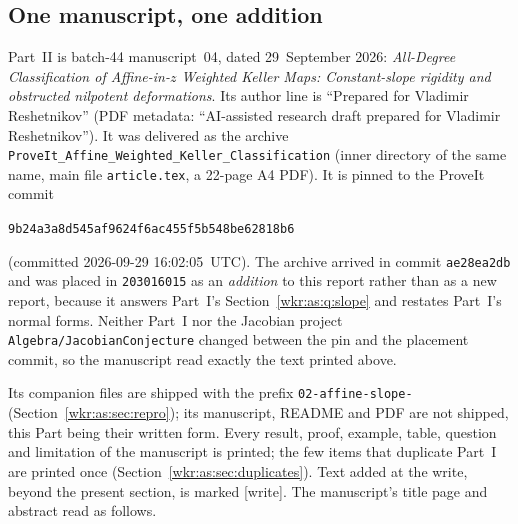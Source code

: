 \documentclass[11pt,a4paper]{article}
\numberwithin{equation}{section}
\theoremstyle{definition}
\theoremstyle{remark}
\newcommand{\rpath}[1]{\nolinkurl{#1}}
\begin{document}
\subsection{One manuscript, one addition}\label{wkr:as:sec:source}
Part~II is batch-44 manuscript~04, dated 29~September 2026:
\emph{All-Degree Classification of Affine-in-$z$ Weighted Keller Maps:
Constant-slope rigidity and obstructed nilpotent deformations}. Its author
line is ``Prepared for Vladimir Reshetnikov'' (PDF metadata:
``AI-assisted research draft prepared for Vladimir Reshetnikov''). It was
delivered as the archive
\texttt{ProveIt\_Affine\_Weighted\_Keller\_Classification} (inner directory
of the same name, main file \texttt{article.tex}, a 22-page A4 PDF). It is
pinned to the ProveIt commit
\begin{center}
\texttt{9b24a3a8d545af9624f6ac455f5b548be62818b6}
\end{center}
(committed 2026-09-29 16:02:05~UTC). The archive arrived in commit
\texttt{ae28ea2db} and was placed in \texttt{203016015} as an
\emph{addition} to this report rather than as a new report, because it
answers Part~I's Section~\ref{wkr:as:q:slope} and restates Part~I's normal
forms. Neither Part~I nor the Jacobian project
\rpath{Algebra/JacobianConjecture} changed between the pin and the
placement commit, so the manuscript read exactly the text printed above.

Its companion files are shipped with the prefix \texttt{02-affine-slope-}
(Section~\ref{wkr:as:sec:repro}); its manuscript, README and PDF are not
shipped, this Part being their written form. Every result, proof, example,
table, question and limitation of the manuscript is printed; the few items
that duplicate Part~I are printed once
(Section~\ref{wkr:as:sec:duplicates}). Text added at the write, beyond the
present section, is marked \textup{[write]}. The manuscript's title page
and abstract read as follows.
\end{document}
